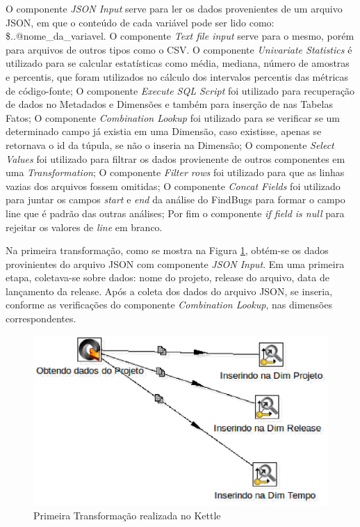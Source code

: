 \begin{apendicesenv}
O componente \textit{JSON Input} serve para ler os dados provenientes de um arquivo JSON, em que o conteúdo de cada variável pode ser lido como: \$..@nome\_da\_variavel. O componente \textit{Text file input} serve para o mesmo, porém para arquivos de outros tipos como o CSV.
O componente \textit{Univariate Statistics} é utilizado para se calcular estatísticas como média, mediana, número de amostras e percentis, que foram utilizados no cálculo dos intervalos percentis das métricas de código-fonte; O componente \textit{Execute SQL Script} foi utilizado para recuperação de dados no Metadados e Dimensões e também para inserção de nas Tabelas Fatos; O componente \textit{Combination Lookup} foi utilizado para se verificar se um determinado campo já existia em uma Dimensão, caso existisse, apenas se retornava o id da túpula, se não o inseria na Dimensão; O componente \textit{Select Values} foi utilizado para filtrar os dados provienente de outros componentes em uma \textit{Transformation}; O componente \textit{Filter rows} foi utilizado para que as linhas vazias dos arquivos fossem omitidas; O componente \textit{Concat Fields} foi utilizado para juntar os campos \textit{start} e \textit{end} da análise do FindBugs para formar o campo line que é padrão das outras análises; Por fim o componente \textit{if field is null} para rejeitar os valores de \textit{line} em branco.

Na primeira transformação, como se mostra na Figura \ref{fig:firsttransformation}, obtém-se os dados provinientes do arquivo JSON com componente \textit{JSON Input}. Em uma primeira etapa, coletava-se sobre dados: nome do projeto, release do arquivo, data de lançamento da release. Após a coleta dos dados do arquivo JSON, se inseria, conforme as verificações do componente \textit{Combination Lookup}, nas dimensões correspondentes.

\begin{figure}[h!]
\centering
\includegraphics[keepaspectratio=false,scale=0.65]{figuras/figuras_nilton/firsttransformation.eps}
\caption{Primeira Transformação realizada no Kettle}
\label{fig:firsttransformation}
\end{figure}
\FloatBarrier


\end{apendicesenv}

